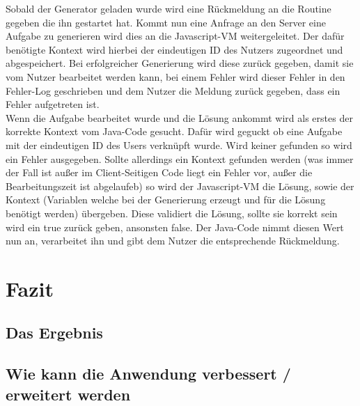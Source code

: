 \begin{enumerate}
Sobald der Generator geladen wurde wird eine Rückmeldung an die Routine gegeben die ihn gestartet hat. Kommt nun eine Anfrage an den Server eine Aufgabe zu generieren wird dies an die Javascript-VM weitergeleitet. Der dafür benötigte Kontext wird hierbei der eindeutigen ID des Nutzers zugeordnet und abgespeichert. Bei erfolgreicher Generierung wird diese zurück gegeben, damit sie vom Nutzer bearbeitet werden kann, bei einem Fehler wird dieser Fehler in den Fehler-Log geschrieben und dem Nutzer die Meldung zurück gegeben, dass ein Fehler aufgetreten ist. \\

Wenn die Aufgabe bearbeitet wurde und die Lösung ankommt wird als erstes der korrekte Kontext vom Java-Code gesucht. Dafür wird geguckt ob eine Aufgabe mit der eindeutigen ID des Users verknüpft wurde. Wird keiner gefunden so wird ein Fehler ausgegeben. Sollte allerdings ein Kontext gefunden werden (was immer der Fall ist außer im Client-Seitigen Code liegt ein Fehler vor, außer die Bearbeitungszeit ist abgelaufeb) so wird der Javascript-VM die Lösung, sowie der Kontext (Variablen welche bei der Generierung erzeugt und für die Lösung benötigt werden) übergeben. Diese validiert die Lösung, sollte sie korrekt sein wird ein true zurück geben, ansonsten false. Der Java-Code nimmt diesen Wert nun an, verarbeitet ihn und gibt dem Nutzer die entsprechende Rückmeldung.


\chapter{Fazit}




\section{Das Ergebnis}


\section{Wie kann die Anwendung verbessert / erweitert werden}

\listoffigures
\begin{thebibliography}{}



\end{thebibliography}
\end{enumerate}
